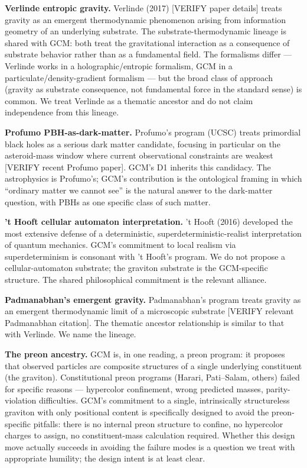 \documentclass[12pt]{article}
\theoremstyle{definition}
\theoremstyle{remark}
\begin{document}
\textbf{Verlinde entropic gravity.} Verlinde (2017) {[}VERIFY paper
details{]} treats gravity as an emergent thermodynamic phenomenon
arising from information geometry of an underlying substrate. The
substrate-thermodynamic lineage is shared with GCM: both treat the
gravitational interaction as a consequence of substrate behavior rather
than as a fundamental field. The formalisms differ --- Verlinde works in
a holographic/entropic formalism, GCM in a particulate/density-gradient
formalism --- but the broad class of approach (gravity as substrate
consequence, not fundamental force in the standard sense) is common. We
treat Verlinde as a thematic ancestor and do not claim independence from
this lineage.

\textbf{Profumo PBH-as-dark-matter.} Profumo's program (UCSC) treats
primordial black holes as a serious dark matter candidate, focusing in
particular on the asteroid-mass window where current observational
constraints are weakest {[}VERIFY recent Profumo paper{]}. GCM's D1
inherits this candidacy. The astrophysics is Profumo's; GCM's
contribution is the ontological framing in which ``ordinary matter we
cannot see'' is the natural answer to the dark-matter question, with
PBHs as one specific class of such matter.

\textbf{'t Hooft cellular automaton interpretation.} 't Hooft (2016)
developed the most extensive defense of a deterministic,
superdeterministic-realist interpretation of quantum mechanics. GCM's
commitment to local realism via superdeterminism is consonant with 't
Hooft's program. We do not propose a cellular-automaton substrate; the
graviton substrate is the GCM-specific structure. The shared
philosophical commitment is the relevant alliance.

\textbf{Padmanabhan's emergent gravity.} Padmanabhan's program treats
gravity as an emergent thermodynamic limit of a microscopic substrate
{[}VERIFY relevant Padmanabhan citation{]}. The thematic ancestor
relationship is similar to that with Verlinde. We name the lineage.

\textbf{The preon ancestry.} GCM is, in one reading, a preon program: it
proposes that observed particles are composite structures of a single
underlying constituent (the graviton). Constitutional preon programs
(Harari, Pati--Salam, others) failed for specific reasons --- hypercolor
confinement, wrong predicted masses, parity-violation difficulties.
GCM's commitment to a single, intrinsically structureless graviton with
only positional content is specifically designed to avoid the
preon-specific pitfalls: there is no internal preon structure to
confine, no hypercolor charges to assign, no constituent-mass
calculation required. Whether this design move actually succeeds in
avoiding the failure modes is a question we treat with appropriate
humility; the design intent is at least clear.
\end{document}
